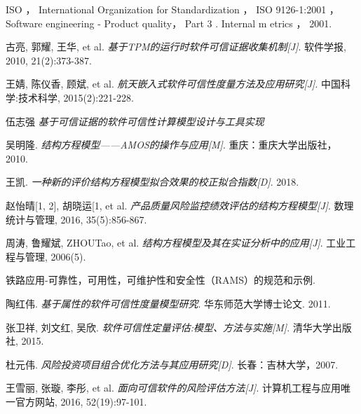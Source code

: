 \begin{thebibliography}{2}
ISO ， International Organization for Standardization ， ISO 9126-1:2001 ， Software engineering - Product quality， Part 3 . Internal m etrics ， 2001.

古亮, 郭耀, 王华, et al. \emph{基于TPM的运行时软件可信证据收集机制[J]}. 软件学报, 2010, 21(2):373-387.

王婧, 陈仪香, 顾斌, et al. \emph{航天嵌入式软件可信性度量方法及应用研究[J]}. 中国科学:技术科学, 2015(2):221-228.

伍志强 \emph{基于可信证据的软件可信性计算模型设计与工具实现}

吴明隆. \emph{结构方程模型——AMOS的操作与应用[M]}. 重庆：重庆大学出版社，2010.

王凯. \emph{一种新的评价结构方程模型拟合效果的校正拟合指数[D]}. 2018.

赵怡晴[1, 2], 胡晓运[1, et al. \emph{产品质量风险监控绩效评估的结构方程模型[J]}. 数理统计与管理, 2016, 35(5):856-867.

周涛, 鲁耀斌, ZHOUTao, et al. \emph{结构方程模型及其在实证分析中的应用[J]}. 工业工程与管理, 2006(5).

铁路应用-可靠性，可用性，可维护性和安全性（RAMS）的规范和示例.

陶红伟. \emph{基于属性的软件可信性度量模型研究}. 华东师范大学博士论文. 2011.

张卫祥, 刘文红, 吴欣. \emph{软件可信性定量评估:模型、方法与实施[M]}. 清华大学出版社, 2015.

杜元伟. \emph{风险投资项目组合优化方法与其应用研究[D]}. 长春：吉林大学，2007.

王雪丽, 张璇, 李彤, et al. \emph{面向可信软件的风险评估方法[J]}. 计算机工程与应用唯一官方网站, 2016, 52(19):97-101.






\end{thebibliography}

